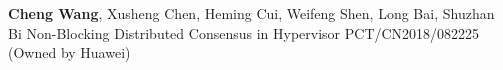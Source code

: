 \cvpub
{\textbf{Cheng Wang}, Xusheng Chen, Heming Cui, Weifeng Shen, Long Bai, Shuzhan Bi} %
{Non-Blocking Distributed Consensus in Hypervisor} %
{} %
{} %
{ %
PCT/CN2018/082225 (Owned by Huawei)
}
